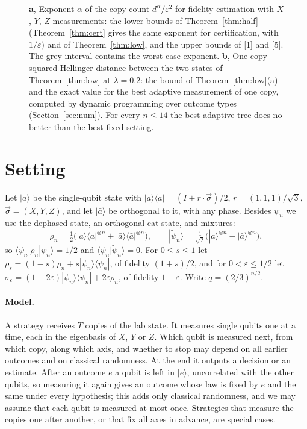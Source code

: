 \documentclass[11pt]{article}
\theoremstyle{remark}
\newcommand{\eps}{\varepsilon}
\newcommand{\ket}[1]{|#1\rangle}
\newcommand{\bra}[1]{\langle #1|}
\newcommand{\abar}{\bar a}
\begin{document}
\begin{figure}[t]
\centering

\caption{\textbf{a}, Exponent $\alpha$ of the copy count $d^\alpha/\eps^2$ for fidelity estimation with $X$, $Y$, $Z$ measurements: the lower bounds of Theorem~\ref{thm:half} (Theorem~\ref{thm:cert} gives the same exponent for certification, with $1/\eps$) and of Theorem~\ref{thm:low}, and the upper bounds of [1] and [5]. The grey interval contains the worst-case exponent. \textbf{b}, One-copy squared Hellinger distance between the two states of Theorem~\ref{thm:low} at $\lambda = 0.2$: the bound of Theorem~\ref{thm:low}(a) and the exact value for the best adaptive measurement of one copy, computed by dynamic programming over outcome types (Section~\ref{sec:num}). For every $n\le14$ the best adaptive tree does no better than the best fixed setting.}
\label{fig:main}
\end{figure}

\section{Setting}\label{sec:setting}

Let $\ket a$ be the single-qubit state with $\ket a\bra a = (I + r\cdot\vec\sigma)/2$, $r = (1,1,1)/\sqrt3$, $\vec\sigma = (X, Y, Z)$, and let $\ket\abar$ be orthogonal to it, with any phase. Besides $\psi_n$ we use the dephased state, an orthogonal cat state, and mixtures:
\[
\rho_n = \tfrac12\bigl(\ket a\bra a^{\otimes n} + \ket\abar\bra\abar^{\otimes n}\bigr),\qquad
\ket{\tilde\psi_n} = \tfrac{1}{\sqrt2}\bigl(\ket a^{\otimes n} - \ket\abar^{\otimes n}\bigr),
\]
so $\bra{\psi_n}\rho_n\ket{\psi_n} = 1/2$ and $\langle\psi_n|\tilde\psi_n\rangle = 0$. For $0\le s\le1$ let $\rho_s = (1-s)\rho_n + s\ket{\psi_n}\bra{\psi_n}$, of fidelity $(1+s)/2$, and for $0<\eps\le1/2$ let $\sigma_\eps = (1-2\eps)\ket{\psi_n}\bra{\psi_n} + 2\eps\rho_n$, of fidelity $1-\eps$. Write $q = (2/3)^{n/2}$.

\paragraph{Model.} A strategy receives $T$ copies of the lab state. It measures single qubits one at a time, each in the eigenbasis of $X$, $Y$ or $Z$. Which qubit is measured next, from which copy, along which axis, and whether to stop may depend on all earlier outcomes and on classical randomness. At the end it outputs a decision or an estimate. After an outcome $e$ a qubit is left in $\ket e$, uncorrelated with the other qubits, so measuring it again gives an outcome whose law is fixed by $e$ and the same under every hypothesis; this adds only classical randomness, and we may assume that each qubit is measured at most once. Strategies that measure the copies one after another, or that fix all axes in advance, are special cases.
\end{document}
